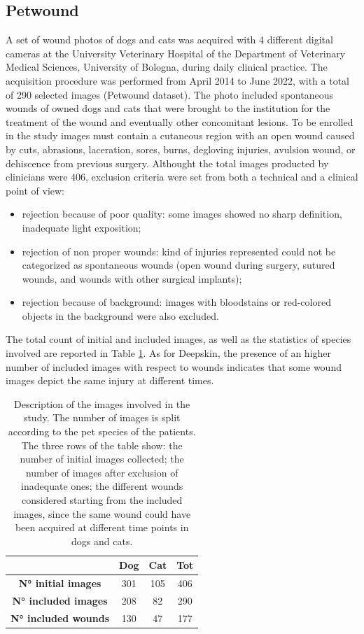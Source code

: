 \documentclass[../main.tex]{subfiles}
\begin{document}
\subsection{Petwound}
A set of wound photos of dogs and cats was acquired with 4 different digital cameras at the University Veterinary Hospital of the Department of Veterinary Medical Sciences, University of Bologna, during daily clinical practice.
The acquisition procedure was performed from April 2014 to June 2022, with a total of 290 selected images (Petwound dataset). 
The photo included spontaneous wounds of owned dogs and cats that were brought to the institution for the treatment of the wound and eventually other concomitant lesions.
To be enrolled in the study images must contain a cutaneous region with an open wound caused by cuts, abrasions, laceration, sores, burns, degloving injuries, avulsion wound, or dehiscence from previous surgery.
Althought the total images producted by clinicians were 406, exclusion criteria were set from both a technical and a clinical point of view:
\begin{itemize}
    \item rejection because of poor quality: some images showed no sharp definition, inadequate light exposition;
    \item rejection of non proper wounds: kind of injuries represented could not be categorized as spontaneous wounds (open wound during surgery, sutured wounds, and wounds with other surgical implants); 
    \item rejection because of background: images with bloodstains or red-colored objects in the background were also excluded.
\end{itemize} 
The total count of initial and included images, as well as the statistics of species involved are reported in Table \ref{tab:PetWound}. 
As for Deepskin, the presence of an higher number of included images with respect to wounds indicates that some wound images depict the same injury at different times.
\begin{table}[!ht]
    \centering
    \begin{tabular}{c|c|c|c|}

        \textbf{} & \textbf{Dog} & \textbf{Cat} & \textbf{Tot } \\ \hline
        \textbf{N° initial images} & 301 & 105 & 406  \\ 
        \textbf{N° included images} & 208 & 82 & 290  \\ 
        \textbf{N° included wounds} & 130 & 47 & 177  \\ \hline
    \end{tabular}
    \caption{Description of the images involved in the study. The number of images is split according to the pet species of the patients. The three rows of the table show: the number of initial images collected; the number of images after exclusion of inadequate ones; the different wounds considered starting from the included images, since the same wound could have been acquired at different time points in dogs and cats.}
    \label{tab:PetWound}
\end{table}
\end{document}
